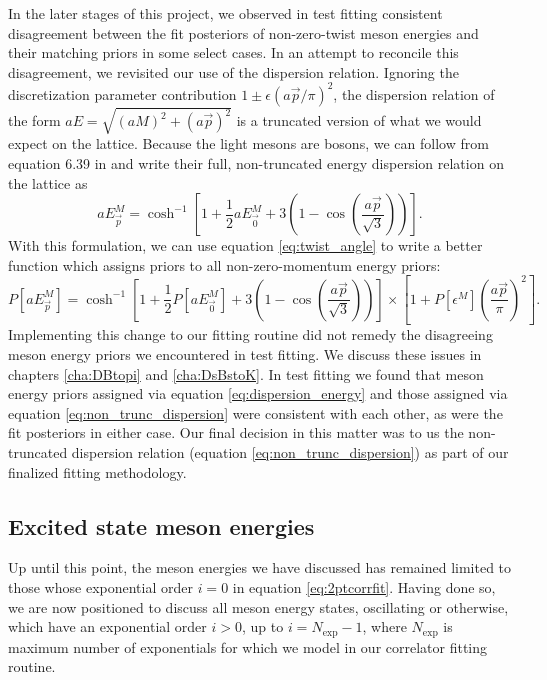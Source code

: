 In the later stages of this project, we observed in test fitting consistent disagreement between the fit posteriors of non-zero-twist meson energies and their matching priors in some select cases.  In an attempt to reconcile this disagreement, we revisited our use of the dispersion relation.  Ignoring the discretization parameter contribution $1\pm\epsilon(a\vec{p}/\pi)^2$, the dispersion relation of the form $aE=\sqrt{(aM)^2+(a\vec{p})^2}$ is a truncated version of what we would expect on the lattice.  Because the light mesons are bosons, we can follow from equation 6.39 in \cite{Smit_2002} and write their full, non-truncated energy dispersion relation on the lattice as
\begin{equation}\label{eq:non_trunc_dispersion}
    aE^M_{\vec{p}} = \cosh^{-1}{\left[1+\frac{1}{2}aE^M_{\vec{0}}+3\left(1-\cos\left(\frac{a\vec{p}}{\sqrt{3}}\right)\right)\right]}.
\end{equation}
With this formulation, we can use equation \ref{eq:twist_angle} to write a better function which assigns priors to all non-zero-momentum energy priors:
\begin{equation}\label{eq:non_trunc_dispersion}
    P[aE^M_{\vec{p}}] = \cosh^{-1}{\left[1+\frac{1}{2}P[aE^M_{\vec{0}}]+3\left(1-\cos\left(\frac{a\vec{p}}{\sqrt3}\right)\right)\right]}\times\left[ 1 + P[\epsilon^M] \left( \frac{a\vec{p}}{\pi} \right)^2     \right].
\end{equation}
Implementing this change to our fitting routine did not remedy the disagreeing meson energy priors we encountered in test fitting.  We discuss these issues in chapters \ref{cha:DBtopi} and \ref{cha:DsBstoK}.  In test fitting we found that meson energy priors assigned via equation \ref{eq:dispersion_energy} and those assigned via equation \ref{eq:non_trunc_dispersion} were consistent with each other, as were the fit posteriors in either case.  Our final decision in this matter was to us the non-truncated dispersion relation (equation \ref{eq:non_trunc_dispersion}) as part of our finalized fitting methodology.   


\subsection{Excited state meson energies}\label{sec:excited_state_energies}
Up until this point, the meson energies we have discussed has remained limited to those whose exponential order $i=0$ in equation \ref{eq:2ptcorrfit}.  Having done so, we are now positioned to discuss all meson energy states, oscillating or otherwise, which have an exponential order $i>0$, up to $i = N_\mathrm{exp}-1$, where $N_\mathrm{exp}$ is maximum number of exponentials for which we model in our correlator fitting routine.

